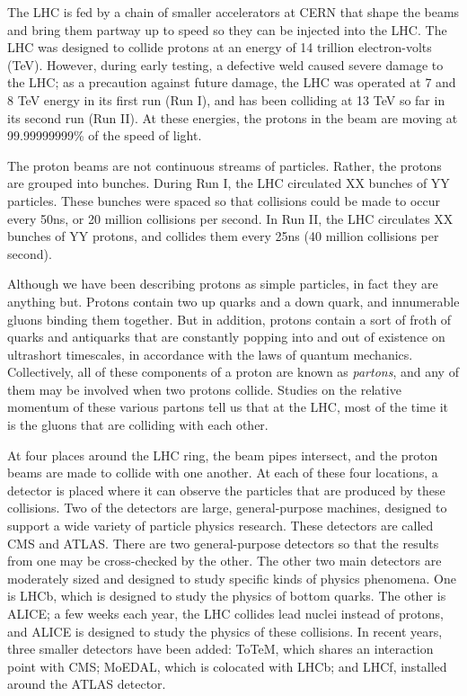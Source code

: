 
The LHC is fed by a chain of smaller accelerators at CERN that shape
the beams and bring them partway up to speed so they can be injected
into the LHC. The LHC was designed to collide protons at an energy of
14 trillion electron-volts (TeV). However, during early testing, a
defective weld caused severe damage to the LHC; as a precaution
against future damage, the LHC was operated at 7 and 8 TeV energy in
its first run (Run I), and has been colliding at 13 TeV so far in its
second run (Run II). At these energies, the protons in the beam are
moving at 99.99999999\% of the speed of light.

The proton beams are not continuous streams of particles. Rather, the
protons are grouped into bunches. During Run I, the LHC circulated XX
bunches of YY particles. These bunches were spaced so that collisions
could be made to occur every 50ns, or 20 million collisions per
second. In Run II, the LHC circulates XX bunches of YY protons, and
collides them every 25ns (40 million collisions per second). %

Although we have been describing protons as simple particles, in fact
they are anything but. Protons contain two up quarks and a down quark,
and innumerable gluons binding them together. But in addition, protons
contain a sort of froth of quarks and antiquarks that are constantly
popping into and out of existence on ultrashort timescales, in
accordance with the laws of quantum mechanics. Collectively, all of
these components of a proton are known as \emph{partons}, and any of
them may be involved when two protons collide. Studies on the relative
momentum of these various partons tell us that at the LHC, most of the
time it is the gluons that are colliding with each other. %

At four places around the LHC ring, the beam pipes intersect, and the
proton beams are made to collide with one another. At each of these
four locations, a detector is placed where it can observe the
particles that are produced by these collisions. Two of
the detectors are large, general-purpose machines, designed to support
a wide variety of particle physics research. These detectors are called CMS
and ATLAS. There are two general-purpose detectors so that the results from one
may be cross-checked by the other. The other two main
detectors are moderately sized and designed to study specific kinds of physics
phenomena. One is LHCb, which is designed to study the physics of
bottom quarks. The other is ALICE; a few weeks each year, the LHC
collides lead nuclei instead of protons, and ALICE is designed to
study the physics of these collisions. In recent years, three smaller detectors have
been added: ToTeM, which shares an interaction point with CMS; MoEDAL,
which is colocated with LHCb; and LHCf, installed around the ATLAS detector.

